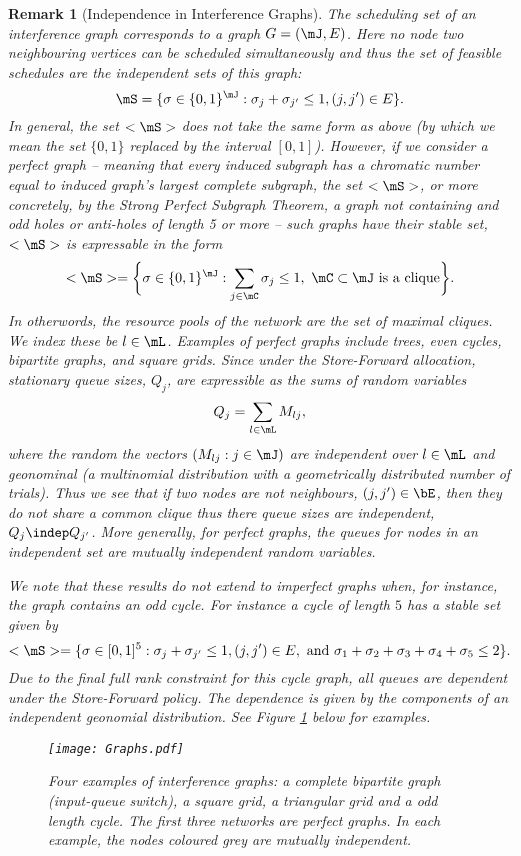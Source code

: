 \documentclass{amsart}
\newtheorem{remark}{Remark}
\begin{document}
\begin{remark}[Independence in Interference Graphs]
The scheduling set of an interference graph corresponds to a graph $G=(\mJ,E)$. Here no node two neighbouring vertices can be scheduled simultaneously and thus the set of feasible schedules are the independent sets of this graph:
\begin{equation}
\mS = \{ \sigma\in\{ 0 ,1 \}^\mJ : \sigma_{j}+\sigma_{j'} \leq 1, (j,j')\in E \}.
\end{equation}
In general, the set $<\mS>$ does not take the same form as above (by which we mean the set $\{0,1\}$ replaced by the interval $[0,1]$). However, if we consider a perfect graph -- meaning that every induced subgraph has a chromatic number equal to induced graph's largest complete subgraph, the set $< \mS >$, or more concretely, by the Strong Perfect Subgraph Theorem, a graph not containing and odd holes or anti-holes of length 5 or more -- such graphs have their stable set, $< \mS >$ is expressable in the form
\begin{equation}
<\mS> =  \bigg\{ \sigma\in\{ 0 ,1 \}^\mJ : \sum_{j\in \mC} \sigma_j \leq 1,\,\, \mC\subset \mJ\text{ is a clique}\bigg\}.
\end{equation}
In otherwords, the resource pools of the network are the set of maximal cliques. We index these be $l\in\mL$.
Examples of perfect graphs include trees, even cycles, bipartite graphs, and square grids. Since under the Store-Forward allocation, stationary queue sizes, $Q_j$, are expressible as the sums of random variables
\begin{equation}
Q_j=\sum_{l\in\mL} M_{lj},
\end{equation}
where the random the vectors $(M_{lj}:j\in\mJ)$ are independent over $l\in\mL$ and geonominal (a multinomial distribution with a geometrically distributed number of trials).  Thus we see that if two nodes are not neighbours, $(j,j')\in\bE$, then they do not share a common clique thus there queue sizes are independent, $Q_j\indep Q_{j'}$.  More generally, for perfect graphs, the queues for nodes in an independent set are mutually independent random variables.

We note that these results do not extend to imperfect graphs when, for instance, the graph contains an odd cycle. For instance a cycle of length $5$ has a stable set given by
\begin{equation}
<\mS> = \{ \sigma\in [0,1]^5 : \sigma_j + \sigma_{j'}\leq 1, (j,j')\in E, \text{ and }  \sigma_1+\sigma_2+\sigma_3+\sigma_4+\sigma_5 \leq 2  \}.
\end{equation}
Due to the final \emph{full rank} constraint for this cycle graph,  all queues are dependent under the Store-Forward policy. The dependence is given by the components of an independent geonomial distribution. See Figure \ref{Graphs} below for  examples. 
\begin{figure}[h!]
  \centering
\texttt{[image: Graphs.pdf]}
\caption{Four examples of interference graphs: a complete bipartite graph (input-queue switch), a square grid, a triangular grid and a odd length cycle. The first three networks are perfect graphs. In each example, the nodes coloured grey are mutually independent.
\label{Graphs} }
\end{figure}
\end{remark}
\end{document}
